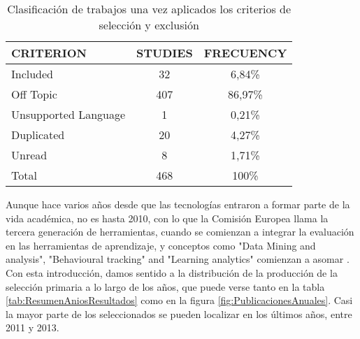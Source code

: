 \begin{table}[H]
  \begin{center}
  \begin{tabular}{| m{4cm} | c | c |}
    \hline
    CRITERION & STUDIES & FRECUENCY\\
    \hline
    \hline 
    Included & 32 & 6,84\% \\
    \hline
    Off Topic & 407 & 86,97\% \\
    \hline
    Unsupported Language & 1 & 0,21\% \\
    \hline
    Duplicated & 20 & 4,27\% \\
    \hline
    Unread & 8 & 1,71\% \\
    \hline
    Total & 468 & 100\% \\
    \hline
  \end{tabular}
\end{center}
\caption{Clasificación de trabajos una vez aplicados los criterios de selección y exclusión}
\label{tab:ResumenSelecccionResultados}
\end{table} 



Aunque hace varios años desde que las tecnologías entraron a formar parte de la vida académica, no es hasta 2010, con lo que la Comisión Europea llama la tercera generación de herramientas, cuando se comienzan a integrar la evaluación en las herramientas de aprendizaje, y conceptos como "Data Mining and analysis", "Behavioural tracking" and "Learning analytics" comienzan a asomar \cite{Redecker:2013}. Con esta introducción, damos sentido a la distribución de la producción de la selección primaria a lo largo de los años, que puede verse tanto en la tabla \ref{tab:ResumenAniosResultados} como en la figura \ref{fig:PublicacionesAnuales}. Casi la mayor parte de los seleccionados se pueden localizar en los últimos años, entre 2011 y 2013.


